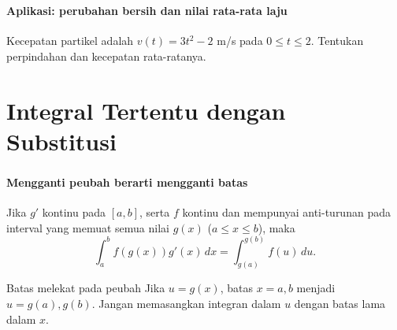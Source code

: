 \documentclass{../../kalkulus-ppt}
\begin{document}
\begin{frame}
\frametitle{\insertsection}
\framesubtitle{Aplikasi: perubahan bersih dan nilai rata-rata laju}

\begin{contoh}
Kecepatan partikel adalah $v(t)=3t^2-2$ m/s pada $0\le t\le2$. Tentukan perpindahan dan kecepatan rata-ratanya.
\end{contoh}
\end{frame}

\section{Integral Tertentu dengan Substitusi}

\begin{frame}
\frametitle{\insertsection}
\framesubtitle{Mengganti peubah berarti mengganti batas}

\begin{teorema}
Jika $g'$ kontinu pada $[a,b]$, serta $f$ kontinu dan mempunyai anti-turunan pada interval yang memuat semua nilai $g(x)$ ($a\le x\le b$), maka
\[\int_a^b f(g(x))g'(x)\,dx=\int_{g(a)}^{g(b)}f(u)\,du.\]
\end{teorema}
\begin{alertblock}{Batas melekat pada peubah}
Jika $u=g(x)$, batas $x=a,b$ menjadi $u=g(a),g(b)$. Jangan memasangkan integran dalam $u$ dengan batas lama dalam $x$.
\end{alertblock}
\end{frame}
\end{document}
